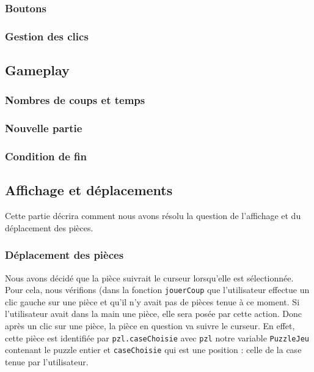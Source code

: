 \documentclass[]{article}
\newcommand{\variable}[1]{\noindent \texttt{#1}}
\begin{document}
\subsubsection{Boutons}
\subsubsection{Gestion des clics}


\subsection{Gameplay}
\subsubsection{Nombres de coups et temps}
\subsubsection{Nouvelle partie}
\subsubsection{Condition de fin}


\subsection{Affichage et déplacements}

Cette partie décrira comment nous avons résolu la question de l'affichage et du déplacement des pièces.

\subsubsection{Déplacement des pièces}

Nous avons décidé que la pièce suivrait le curseur lorsqu'elle est sélectionnée. Pour cela, nous vérifions (dans la fonction \variable{jouerCoup} que l'utilisateur effectue un clic gauche sur une pièce et qu'il n'y avait pas de pièces tenue à ce moment. Si l'utilisateur avait dans la main une pièce, elle sera posée par cette action. Donc après un clic sur une pièce, la pièce en question va suivre le curseur. En effet, cette pièce est identifiée par \variable{pzl.caseChoisie} avec \variable{pzl} notre variable \variable{PuzzleJeu} contenant le puzzle entier et \variable{caseChoisie} qui est une position : celle de la case tenue par l'utilisateur.
\end{document}
